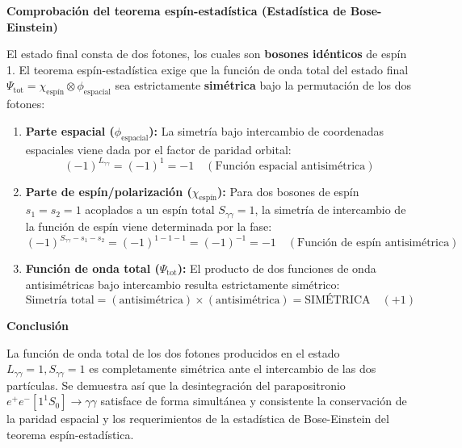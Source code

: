 \begin{problema}
\textbf{Comprobación del teorema espín-estadística (Estadística de Bose-Einstein)}

El estado final consta de dos fotones, los cuales son \textbf{bosones idénticos} de espín 1. El teorema espín-estadística exige que la función de onda total del estado final $\Psi_{\text{tot}} = \chi_{\text{espín}} \otimes \phi_{\text{espacial}}$ sea estrictamente \textbf{simétrica} bajo la permutación de los dos fotones:

\begin{enumerate}[label=\arabic*.]
    \item \textbf{Parte espacial ($\phi_{\text{espacial}}$):} La simetría bajo intercambio de coordenadas espaciales viene dada por el factor de paridad orbital:
    \begin{equation*}
        (-1)^{L_{\gamma\gamma}} = (-1)^1 = -1 \quad (\text{Función espacial antisimétrica})
    \end{equation*}

    \item \textbf{Parte de espín/polarización ($\chi_{\text{espín}}$):} Para dos bosones de espín $s_1 = s_2 = 1$ acoplados a un espín total $S_{\gamma\gamma} = 1$, la simetría de intercambio de la función de espín viene determinada por la fase:
    \begin{equation*}
        (-1)^{S_{\gamma\gamma} - s_1 - s_2} = (-1)^{1 - 1 - 1} = (-1)^{-1} = -1 \quad (\text{Función de espín antisimétrica})
    \end{equation*}

    \item \textbf{Función de onda total ($\Psi_{\text{tot}}$):} El producto de dos funciones de onda antisimétricas bajo intercambio resulta estrictamente simétrico:
    \begin{equation*}
        \text{Simetría total} = (\text{antisimétrica}) \times (\text{antisimétrica}) = \text{SIMÉTRICA} \quad (+1)
    \end{equation*}
\end{enumerate}

\textbf{Conclusión}

La función de onda total de los dos fotones producidos en el estado $L_{\gamma\gamma} = 1, S_{\gamma\gamma} = 1$ es completamente simétrica ante el intercambio de las dos partículas. Se demuestra así que la desintegración del parapositronio $e^+e^-[1^1S_0] \to \gamma\gamma$ satisface de forma simultánea y consistente la conservación de la paridad espacial y los requerimientos de la estadística de Bose-Einstein del teorema espín-estadística.
\end{problema}

